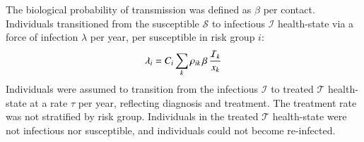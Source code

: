\par
The biological probability of transmission was defined as $\beta$ per contact.
Individuals transitioned from the
susceptible $\mathcal{S}$ to infectious $\mathcal{I}$ health-state
via a force of infection $\lambda$ per year, per susceptible in risk group $i$:
\begin{equation}
\lambda_{i} =
C_{i} \sum_k \rho_{ik} \thinspace  \beta \thinspace \frac{\mathcal{I}_k}{x_k}
\label{eq:foi}
\end{equation}
Individuals were assumed to transition from the
infectious $\mathcal{I}$ to treated $\mathcal{T}$ health-state
at a rate $\tau$ per year, reflecting diagnosis and treatment.
The treatment rate was not stratified by risk group.
Individuals in the treated $\mathcal{T}$ health-state were not infectious nor susceptible,
and individuals could not become re-infected.
